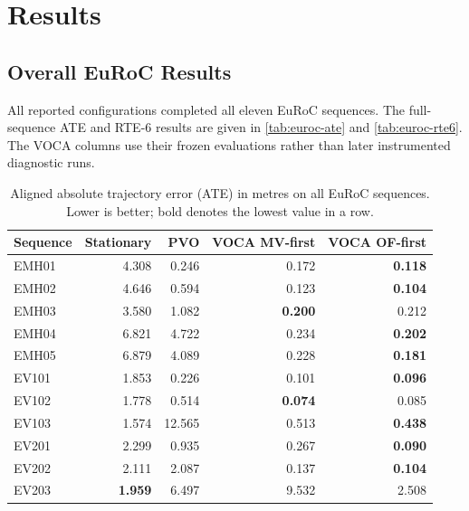 
\chapter{Results}\label{chapter:results}

\section{Overall EuRoC Results}

All reported configurations completed all eleven EuRoC sequences. The
full-sequence ATE and RTE-6 results are given in \autoref{tab:euroc-ate} and
\autoref{tab:euroc-rte6}. The VOCA columns use their frozen evaluations rather
than later instrumented diagnostic runs.

\begin{table}[p]
  \centering
  \caption[Absolute trajectory error on EuRoC]{Aligned absolute trajectory error (ATE) in metres on all EuRoC
  sequences. Lower is better; bold denotes the lowest value in a row.}
  \label{tab:euroc-ate}
  \begin{tabular}{@{}lrrrr@{}}
    \toprule
    Sequence & Stationary & PVO & VOCA MV-first & VOCA OF-first \\
    \midrule
    EMH01 & 4.308 & 0.246 & 0.172 & \textbf{0.118} \\
    EMH02 & 4.646 & 0.594 & 0.123 & \textbf{0.104} \\
    EMH03 & 3.580 & 1.082 & \textbf{0.200} & 0.212 \\
    EMH04 & 6.821 & 4.722 & 0.234 & \textbf{0.202} \\
    EMH05 & 6.879 & 4.089 & 0.228 & \textbf{0.181} \\
    EV101 & 1.853 & 0.226 & 0.101 & \textbf{0.096} \\
    EV102 & 1.778 & 0.514 & \textbf{0.074} & 0.085 \\
    EV103 & 1.574 & 12.565 & 0.513 & \textbf{0.438} \\
    EV201 & 2.299 & 0.935 & 0.267 & \textbf{0.090} \\
    EV202 & 2.111 & 2.087 & 0.137 & \textbf{0.104} \\
    EV203 & \textbf{1.959} & 6.497 & 9.532 & 2.508 \\
    \bottomrule
  \end{tabular}
\end{table}

